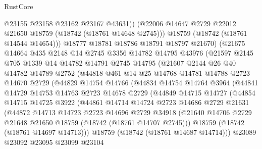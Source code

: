 \begin{lexlean}{RustCore}
\begin{coremodule}
              @23155
              @23158
              @23162
              @23167
              @43631))
          (@22006 @14647 @2729 @22012 @21650 @18759 (@18742 (@18761 @14648 @2745)))
          @18759
          (@18742 (@18761 @14544 @14654)))
        @18777
        @18781
        @18786
        @18791
        @18797
        @21670)
      (@21675
        @14664
        @435
        @2148
        @14
        @2745
        @3356
        @14782
        @14795
        @43976
        (@21597
          @2145
          @705
          @1339
          @14
          @14782
          @14791
          @2745
          @14795
          (@21607
            @2144
            @26
            @40
            @14782
            @14789
            @2752
            (@44818
              @461
              @14
              @25
              @14768
              @14781
              @14788
              @2723
              @14670
              @2729
              (@44829
                @14754
                @14766
                (@44834
                  @14754
                  @14764
                  @3964
                  (@44841
                    @14729
                    @14753
                    @14763
                    @2723
                    @14678
                    @2729
                    (@44849
                      @14715
                      @14727
                      (@44854
                        @14715
                        @14725
                        @3922
                        (@44861
                          @14714
                          @14724
                          @2723
                          @14686
                          @2729
                          @21631
                          (@44872
                            @14713
                            @14723
                            @2723
                            @14696
                            @2729
                            @34918
                            (@21640
                              @14706
                              @2729
                              @21648
                              @21650
                              @18759
                              (@18742 (@18761 @14707 @2745)))
                            @18759
                            (@18742 (@18761 @14697 @14713)))
                          @18759
                          (@18742 (@18761 @14687 @14714)))
                        @23089
                        @23092
                        @23095
                        @23099
                        @23104

\end{coremodule}
\end{lexlean}
